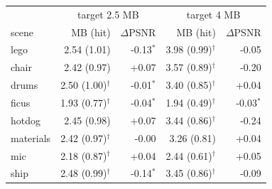 \begin{tabular}{lrrrr}
\toprule
& \multicolumn{2}{c}{target 2.5 MB} & \multicolumn{2}{c}{target 4 MB} \\
scene & MB (hit) & $\Delta$PSNR & MB (hit) & $\Delta$PSNR \\
\midrule
lego & 2.54 (1.01) & -0.13$^*$ & 3.98 (0.99)$^\dagger$ & -0.05 \\
chair & 2.42 (0.97) & +0.07 & 3.57 (0.89)$^\dagger$ & -0.20 \\
drums & 2.50 (1.00)$^\dagger$ & -0.01$^*$ & 3.40 (0.85)$^\dagger$ & +0.04 \\
ficus & 1.93 (0.77)$^\dagger$ & -0.04$^*$ & 1.94 (0.49)$^\dagger$ & -0.03$^*$ \\
hotdog & 2.45 (0.98) & +0.07 & 3.44 (0.86)$^\dagger$ & -0.24 \\
materials & 2.42 (0.97)$^\dagger$ & -0.00 & 3.26 (0.81) & +0.04 \\
mic & 2.18 (0.87)$^\dagger$ & +0.04 & 2.44 (0.61)$^\dagger$ & +0.05 \\
ship & 2.48 (0.99)$^\dagger$ & -0.14$^*$ & 3.45 (0.86)$^\dagger$ & -0.09 \\
\bottomrule
\end{tabular}
